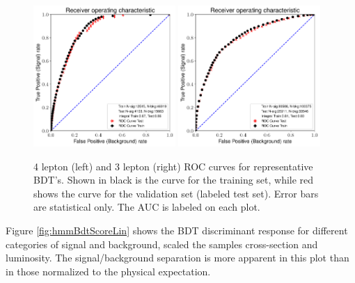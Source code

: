 \begin{figure}[htpb]
  \centering
  \includegraphics[width=0.48\textwidth]{figures/hmm/bdtHist/roc-4lep-ZH-AllBackground-0-depth2-nEst80tag-new-AllBackground.pdf}
  \includegraphics[width=0.48\textwidth]{figures/hmm/bdtHist/roc-3lep-WH-AllBackground-0-depth2-nEst50tag-new-AllBackground.pdf}
  \caption{4 lepton (left) and 3 lepton (right) ROC curves for representative BDT's. Shown in black is the curve for the training set, while red shows the curve for the validation set (labeled test set). Error bars are statistical only. The AUC is labeled on each plot.}
    \label{fig:hmmBdtRoc}
\end{figure}

Figure \ref{fig:hmmBdtScoreLin} shows the BDT discriminant response for different categories of signal and background, scaled the samples cross-section and luminosity. The signal/background separation is more apparent in this plot than in those normalized to the physical expectation.


